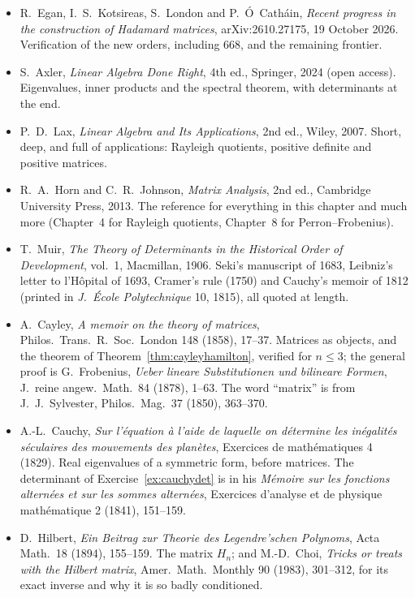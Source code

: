 \begin{itemize}\raggedright
\item R.~Egan, I.~S.~Kotsireas, S.~London and P.~\'O~Cath\'ain, \emph{Recent progress in the construction of Hadamard matrices}, arXiv:2610.27175, 19 October 2026. Verification of the new orders, including $668$, and the remaining frontier.
\item S.~Axler, \emph{Linear Algebra Done Right}, 4th ed., Springer, 2024 (open access). Eigenvalues, inner products and the spectral theorem, with determinants at the end.
\item P.~D.~Lax, \emph{Linear Algebra and Its Applications}, 2nd ed., Wiley, 2007. Short, deep, and full of applications: Rayleigh quotients, positive definite and positive matrices.
\item R.~A.~Horn and C.~R.~Johnson, \emph{Matrix Analysis}, 2nd ed., Cambridge University Press, 2013. The reference for everything in this chapter and much more (Chapter~4 for Rayleigh quotients, Chapter~8 for Perron--Frobenius).
\item T.~Muir, \emph{The Theory of Determinants in the Historical Order of Development}, vol.~1, Macmillan, 1906. Seki's manuscript of 1683, Leibniz's letter to l'H\^opital of 1693, Cramer's rule (1750) and Cauchy's memoir of 1812 (printed in \emph{J.\ \'Ecole Polytechnique} 10, 1815), all quoted at length.
\item A.~Cayley, \emph{A memoir on the theory of matrices}, Philos.\ Trans.\ R.\ Soc.\ London 148 (1858), 17--37. Matrices as objects, and the theorem of Theorem~\ref{thm:cayleyhamilton}, verified for $n\le3$; the general proof is G.~Frobenius, \emph{Ueber lineare Substitutionen und bilineare Formen}, J.\ reine angew.\ Math.\ 84 (1878), 1--63. The word ``matrix'' is from J.~J.~Sylvester, Philos.\ Mag.\ 37 (1850), 363--370.
\item A.-L.~Cauchy, \emph{Sur l'\'equation \`a l'aide de laquelle on d\'etermine les in\'egalit\'es s\'eculaires des mouvements des plan\`etes}, Exercices de math\'ematiques 4 (1829). Real eigenvalues of a symmetric form, before matrices. The determinant of Exercise~\ref{ex:cauchydet} is in his \emph{M\'emoire sur les fonctions altern\'ees et sur les sommes altern\'ees}, Exercices d'analyse et de physique math\'ematique 2 (1841), 151--159.
\item D.~Hilbert, \emph{Ein Beitrag zur Theorie des Legendre'schen Polynoms}, Acta Math.\ 18 (1894), 155--159. The matrix $H_n$; and M.-D.~Choi, \emph{Tricks or treats with the Hilbert matrix}, Amer.\ Math.\ Monthly 90 (1983), 301--312, for its exact inverse and why it is so badly conditioned.

\end{itemize}

